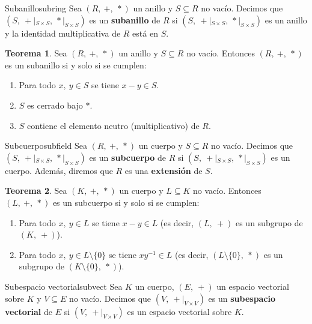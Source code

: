\documentclass[a4paper]{book}
\theoremstyle{definition}
\newtheorem{theorem}{Teorema}[section]
\theoremstyle{ejemplo}
\theoremstyle{demostracion}
\begin{document}
\begin{define}{Subanillo}{subring}
	Sea $(R,\ +,\ *)$ un anillo y $S \subseteq R$ no vacío. Decimos que $(S,\ +|_{S \times S},\ *|_{S \times S})$ es un \textbf{subanillo} de $R$ si $(S,\ +|_{S \times S},\ *|_{S \times S})$ es un anillo y la identidad multiplicativa de $R$ está en $S$.
\end{define}

\begin{theorem}
	Sea $(R,\ +,\ *)$ un anillo y $S \subseteq R$ no vacío. Entonces $(R,\ +,\ *)$ es un subanillo si y solo si se cumplen:
	\begin{enumerate}
		\item
		Para todo $x,\ y \in S$ se tiene $x - y \in S$.
		\item
		$S$ es cerrado bajo $*$.
		\item
		$S$ contiene el elemento neutro (multiplicativo) de $R$.
	\end{enumerate}
\end{theorem}

\begin{define}{Subcuerpo}{subfield}\label{field_extensions_primero}
	Sea $(R,\ +,\ *)$ un cuerpo y $S \subseteq R$ no vacío. Decimos que $(S,\ +|_{S \times S},\ *|_{S \times S})$ es un \textbf{subcuerpo} de $R$ si $(S,\ +|_{S \times S},\ *|_{S \times S})$ es un cuerpo. Además, diremos que $R$ es una \textbf{extensión} de $S$.
\end{define}

\begin{theorem}
	Sea $(K,\ +,\ *)$ un cuerpo y $L \subseteq K$ no vacío. Entonces $(L,\ +,\ *)$ es un subcuerpo si y solo si se cumplen:
	\begin{enumerate}
		\item
		Para todo $x,\ y \in L$ se tiene $x - y \in L$ (es decir, $(L,\ +)$ es un subgrupo de $(K,\ +)$).
		\item
		Para todo $x,\ y \in L \setminus \{0 \}$ se tiene $xy^{-1} \in L$ (es decir, $(L\setminus \{0 \},\ *)$ es un subgrupo de $(K\setminus \{0 \},\ *)$).
	\end{enumerate}
\end{theorem}

\begin{define}{Subespacio vectorial}{subvect}
	Sea $K$ un cuerpo, $(E,\ +)$ un espacio vectorial sobre $K$ y $V \subseteq E$ no vacío. Decimos que $(V,\ +|_{V \times V})$ es un \textbf{subespacio vectorial} de $E$ si $(V,\ +|_{V \times V})$ es un espacio vectorial sobre $K$.
\end{define}
\end{document}
